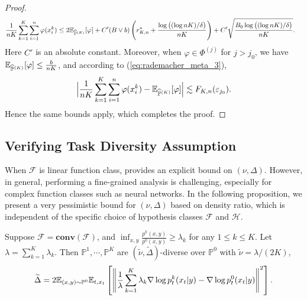 \documentclass[11pt]{article}
\numberwithin{equation}{section}
\renewcommand{\P}{\mathbb{P}}
\renewcommand{\eqref}[1]{(\ref{#1})}
\begin{document}
\begin{proof}
\begin{align}
        &\frac{1}{nK}\sum_{k=1}^K\sum_{i=1}^n\varphi(x_i^k)\leq 2\E_{\widehat{\P}^{(K)}}[\varphi]+C'(B\vee b)\left(r_{K,n}^* + \frac{\log\big((\log nK)/\delta\big)}{nK}\right)+C'\sqrt{\frac{B_0\log\big((\log nK)/\delta\big)}{nK}}.
    \end{align}
    Here $C'$ is an absolute constant. Moreover, when $\varphi\in\Phi^{(j)}$ for $j>j_0$, we have $\E_{\widehat{\P}^{(K)}}[\varphi]\leq \frac{b}{nK}$, and according to \eqref{eq:rademacher_meta_3},
    \begin{equation}
        \Big|\frac{1}{nK}\sum_{k=1}^K\sum_{i=1}^n\varphi(x_i^k)-\E_{\widehat{\P}^{(K)}}[\varphi]\Big|\lesssim F_{K,n}(\varepsilon_{j_0}).
    \end{equation}
    Hence the same bounds apply, which completes the proof.
\end{proof}

\subsection{Verifying Task Diversity Assumption}\label{app:subsec:verify_diversity}

When $\mathcal{F}$ is linear function class, \citet{tripuraneni2020theory} provides an explicit bound on $(\nu,\Delta)$.
However, in general, performing a fine-grained analysis is challenging, especially for complex function classes such as neural networks.
In the following proposition, we present a very pessimistic bound for $(\nu,\Delta)$ based on density ratio, which is independent of the specific choice of hypothesis classes $\mathcal{F}$ and $\mathcal{H}$.
\begin{prop}
    Suppose $\mathcal{F}=\textbf{conv}(\mathcal{F})$,
    and $\inf_{x,y}\frac{p^k(x,y)}{p^0(x,y)}\geq \lambda_k$ for any $1\leq k\leq K$.
    Let $\lambda=\sum_{k=1}^K\lambda_k$.
    Then $\P^1,\cdots,\P^K$ are $(\widetilde{\nu},\widetilde{\Delta})$-diverse over $\P^0$ with $\widetilde{\nu}=\lambda/(2K)$,
    \begin{equation}
        \widetilde{\Delta}=2\E_{(x,y)\sim\P^0}\E_{t,x_t}\left[\left\|\frac{1}{\lambda}\sum_{k=1}^K\lambda_k\nabla\log p_t^k(x_t|y)-\nabla\log p_t^0(x_t|y)\right\|^2\right].
    \end{equation}
\end{prop}
\end{document}
